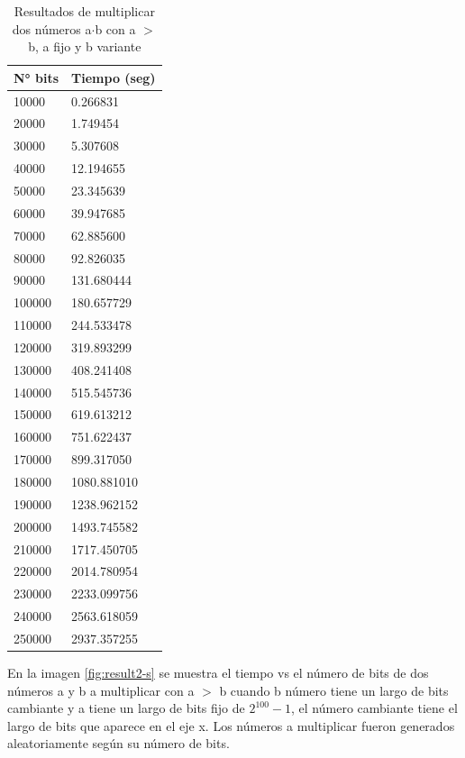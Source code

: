 \documentclass[10pt,journal,compsoc]{IEEEtran}
\begin{document}
\begin{table}[h]
\centering
\caption{Resultados de multiplicar dos números a$\cdot$b con a $>$ b, a fijo y b variante}
\label{tab:result2-s}
\begin{tabular}{|l|l|}
\hline
N° bits & Tiempo (seg) \\ \hline
10000  & 0.266831    \\ \hline
20000  & 1.749454    \\ \hline
30000  & 5.307608    \\ \hline
40000  & 12.194655   \\ \hline
50000  & 23.345639   \\ \hline
60000  & 39.947685   \\ \hline
70000  & 62.885600   \\ \hline
80000  & 92.826035   \\ \hline
90000  & 131.680444  \\ \hline
100000 & 180.657729  \\ \hline
110000 & 244.533478  \\ \hline
120000 & 319.893299  \\ \hline
130000 & 408.241408  \\ \hline
140000 & 515.545736  \\ \hline
150000 & 619.613212  \\ \hline
160000 & 751.622437  \\ \hline
170000 & 899.317050  \\ \hline
180000 & 1080.881010 \\ \hline
190000 & 1238.962152 \\ \hline
200000 & 1493.745582 \\ \hline
210000 & 1717.450705 \\ \hline
220000 & 2014.780954 \\ \hline
230000 & 2233.099756 \\ \hline
240000 & 2563.618059 \\ \hline
250000 & 2937.357255 \\ \hline
\end{tabular}
\end{table}

En la imagen \ref{fig:result2-s} se muestra el tiempo vs el número de bits de dos números a y b a multiplicar con a $>$ b cuando b número tiene un largo de bits cambiante y a tiene un largo de bits fijo de  $2^{100}-1$, el número cambiante tiene el largo de bits que aparece en el eje x. Los números a multiplicar fueron generados aleatoriamente según su número de bits.
\end{document}
